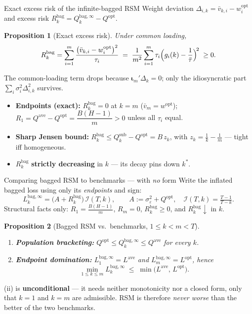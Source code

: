 \documentclass[11pt,aspectratio=169]{beamer}
\newcommand{\wopt}{w^{\mathrm{opt}}}
\newcommand{\Qopt}{Q^{\mathrm{opt}}}
\newcommand{\Qave}{Q^{\mathrm{ave}}}
\newcommand{\Qsub}{Q_k^{\mathrm{sub}}}
\newcommand{\Qbag}{Q_k^{\mathrm{bag},\infty}}
\newcommand{\Lopt}{L^{\mathrm{opt}}}
\newcommand{\Lave}{L^{\mathrm{ave}}}
\newcommand{\Lbag}{L_k^{\mathrm{bag},\infty}}
\newcommand{\Rk}{R_k^{\mathrm{bag}}}
\newcommand{\im}{\bm{\iota}_m}
\newtheorem{propositionX}{Proposition}
\begin{document}
\begin{frame}{Exact excess risk of the infinite-bagged RSM}
  Weight deviation $\Delta_{i,k}=\bar v_{k,i}-w_i^{\mathrm{opt}}$ and excess
  risk $\Rk=\Qbag-\Qopt$.
  \begin{propositionX}[Exact excess risk]
    Under common loading,
    \[
      \Rk=\sum_{i=1}^m\frac{\bigl(\bar v_{k,i}-w_i^{\mathrm{opt}}\bigr)^2}{\tau_i}
        \;=\;\frac{1}{m^2}\sum_{i=1}^m\tau_i\Bigl(g_i(k)-\frac{1}{\bar\tau}\Bigr)^{\!2}\;\ge0 .
    \]
  \end{propositionX}
  \footnotesize
  The common-loading term drops because $\im'\Delta_k=0$; only the
  idiosyncratic part $\sum_i\sigma_i^2\Delta_{i,k}^2$ survives.
  \begin{itemize}
    \item \textbf{Endpoints (exact):} $\Rk=0$ at $k=m$ ($\bar v_{m}=\wopt$);
      $R_1=\Qave-\Qopt=\dfrac{B(H-1)}{m}>0$ unless all $\tau_i$ equal.
    \item \textbf{Sharp Jensen bound:}
      $\Rk\le\Qsub-\Qopt=B\,z_k$, with $z_k=\tfrac1k-\tfrac1m$ ---
      tight iff homogeneous.
    \item $\Rk$ \textbf{strictly decreasing} in $k$ --- its decay pins down $k^*$.
  \end{itemize}
\end{frame}

\begin{frame}{Comparing bagged RSM to benchmarks --- with \emph{no} form}
  Write the inflated bagged loss using only its \emph{endpoints} and sign:
  \[
    \Lbag=\bigl(A+\Rk\bigr)\,\mathcal{I}(T,k),\qquad
    A:=\sigma_\varepsilon^2+\Qopt,\quad \mathcal{I}(T,k)=\tfrac{T-1}{T-k}.
  \]
  \footnotesize Structural facts only: $R_1=\tfrac{B(H-1)}{m}$, $R_m=0$,
  $\Rk\ge0$, and $\Rk\downarrow$ in $k$.\normalsize
  \begin{propositionX}[Bagged RSM vs.\ benchmarks, $1\le k<m<T$]
    \begin{enumerate}
      \item[(i)] \textbf{Population bracketing:}
        $\Qopt\le\Qbag\le\Qave$ for every $k$.
      \item[(ii)] \textbf{Endpoint domination:}
        $L_1^{\mathrm{bag},\infty}=\Lave$ and
        $L_m^{\mathrm{bag},\infty}=\Lopt$, hence
        \[
          \min_{1\le k\le m}\Lbag\;\le\;\min\bigl(\Lave,\,\Lopt\bigr).
        \]
    \end{enumerate}
  \end{propositionX}
  \footnotesize
  (ii) is \textbf{unconditional} --- it needs neither monotonicity nor a
  closed form, only that $k=1$ and $k=m$ are admissible. RSM is therefore
  \emph{never worse} than the better of the two benchmarks.
\end{frame}
\end{document}
